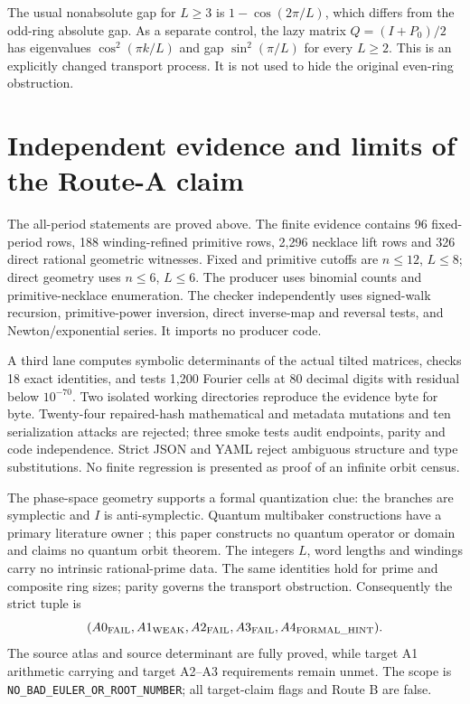 \documentclass[10pt]{article}
\begin{document}
The usual nonabsolute gap for $L\geq3$ is $1-\cos(2\pi/L)$, which differs
from the odd-ring absolute gap. As a separate control, the lazy matrix
$Q=(I+P_0)/2$ has eigenvalues $\cos^2(\pi k/L)$ and gap
$\sin^2(\pi/L)$ for every $L\geq2$. This is an explicitly changed transport
process. It is not used to hide the original even-ring obstruction.

\section{Independent evidence and limits of the Route-A claim}
The all-period statements are proved above. The finite evidence contains
96 fixed-period rows, 188 winding-refined primitive rows, 2,296 necklace
lift rows and 326 direct rational geometric witnesses. Fixed and primitive
cutoffs are $n\leq12$, $L\leq8$; direct geometry uses $n\leq6$, $L\leq6$.
The producer uses binomial counts and primitive-necklace enumeration. The
checker independently uses signed-walk recursion, primitive-power inversion,
direct inverse-map and reversal tests, and Newton/exponential series.
It imports no producer code.

A third lane computes symbolic determinants of the actual tilted matrices,
checks 18 exact identities, and tests 1,200 Fourier cells at 80 decimal
digits with residual below $10^{-70}$. Two isolated working directories
reproduce the evidence byte for byte. Twenty-four repaired-hash mathematical
and metadata mutations and ten serialization attacks are rejected; three
smoke tests audit endpoints, parity and code independence. Strict JSON and
YAML reject ambiguous structure and type substitutions. No finite regression
is presented as proof of an infinite orbit census.

The phase-space geometry supports a formal quantization clue: the branches
are symplectic and $I$ is anti-symplectic. Quantum multibaker constructions
have a primary literature owner \cite{wojcik}; this paper constructs no
quantum operator or domain and claims no quantum orbit theorem. The integers
$L$, word lengths and windings carry no intrinsic rational-prime data.
The same identities hold for prime and composite ring sizes; parity governs
the transport obstruction. Consequently the strict tuple is
\[
(A0_{\rm FAIL},A1_{\rm WEAK},A2_{\rm FAIL},A3_{\rm FAIL},
 A4_{\rm FORMAL\_HINT}).
\]
The source atlas and source determinant are fully proved, while target A1
arithmetic carrying and target A2--A3 requirements remain unmet. The scope is
\texttt{NO\_BAD\_EULER\_OR\_ROOT\_NUMBER}; all target-claim flags and Route B
are false.
\fi
\end{document}
